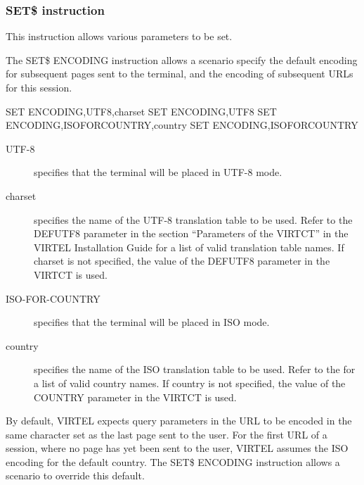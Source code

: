 \documentclass[letterpaper,10pt,english]{sphinxmanual}
\begin{document}
\subsubsection{SET\$ instruction}
\label{\detokenize{User_Guide:set-instruction}}
This instruction allows various parameters to be set.
\label{\detokenize{User_Guide:v457ug-set-encoding}}

The SET\$ ENCODING instruction allows a scenario specify the default encoding for subsequent pages sent to the terminal, and the encoding of subsequent URLs for this session.

\begin{sphinxVerbatim}[commandchars=\\\{\}]
SET\PYGZdl{} ENCODING,UTF\PYGZhy{}8,\PYGZsq{}charset\PYGZsq{}
SET\PYGZdl{} ENCODING,UTF\PYGZhy{}8
SET\PYGZdl{} ENCODING,ISO\PYGZhy{}FOR\PYGZhy{}COUNTRY,\PYGZsq{}country\PYGZsq{}
SET\PYGZdl{} ENCODING,ISO\PYGZhy{}FOR\PYGZhy{}COUNTRY
\end{sphinxVerbatim}
\begin{description}
\item[{UTF-8}] \leavevmode
specifies that the terminal will be placed in UTF-8 mode.

\item[{charset}] \leavevmode
specifies the name of the UTF-8 translation table to be used. Refer to the DEFUTF8 parameter in the section “Parameters of the VIRTCT” in the VIRTEL Installation Guide for a list of valid translation table names. If charset is not specified, the value of the DEFUTF8 parameter in the VIRTCT is used.

\item[{ISO-FOR-COUNTRY}] \leavevmode
specifies that the terminal will be placed in ISO mode.

\item[{country}] \leavevmode
specifies the name of the ISO translation table to be used. Refer to the {\hyperref[\detokenize{User_Guide:v457ug-set-country-code}]{}} for a list of valid country names. If country is not specified, the value of the COUNTRY parameter in the VIRTCT is used.

\end{description}

By default, VIRTEL expects query parameters in the URL to be encoded in the same character set as the last page sent to the user. For the first URL of a session, where no page has yet been sent to the user, VIRTEL assumes the ISO encoding for the default country. The SET\$ ENCODING instruction allows a scenario to override this default.
\end{document}
